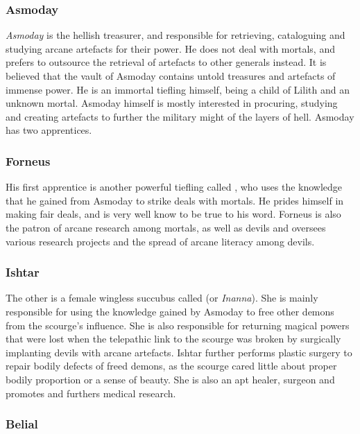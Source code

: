 \subsubsection{Asmoday}
\label{sec:Asmoday}

\emph{Asmoday} is the hellish treasurer, and responsible for retrieving,
cataloguing and studying arcane artefacts for their power. He does not deal
with mortals, and prefers to outsource the retrieval of artefacts to other
generals instead. It is believed that the vault of Asmoday contains untold
treasures and artefacts of immense power. He is an immortal tiefling himself,
being a child of Lilith and an unknown mortal. Asmoday himself is mostly
interested in procuring, studying and creating artefacts to further the
military might of the layers of hell. Asmoday has two apprentices.

\subsubsection{Forneus}

His first apprentice is another powerful tiefling called
, who uses the knowledge that he gained from Asmoday to
strike deals with mortals. He prides himself in making fair deals, and is very
well know to be true to his word. Forneus is also the patron of arcane
research among mortals, as well as devils and oversees various research
projects and the spread of arcane literacy among devils.

\subsubsection{Ishtar}

The other is a female wingless succubus called  (or
\emph{Inanna}). She is mainly responsible for using the knowledge gained by
Asmoday to free other demons from the scourge's influence. She is also
responsible for returning magical powers that were lost when the telepathic
link to the scourge was broken by surgically implanting devils with arcane
artefacts.  Ishtar further performs plastic surgery to repair bodily defects
of freed demons, as the scourge cared little about proper bodily proportion or
a sense of beauty. She is also an apt healer, surgeon and promotes and
furthers medical research.

\subsubsection{Belial}
\label{sec:Belial}


